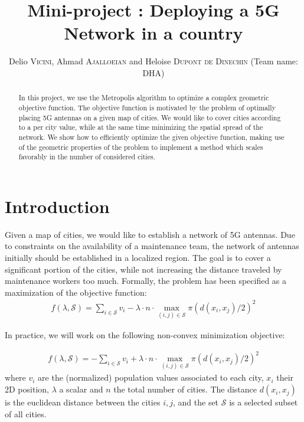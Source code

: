 \documentclass[conference,compsoc]{IEEEtran}
\newcommand{\selected}{\mathcal{S}}
\begin{document}
\title{\Large Mini-project : Deploying a 5G Network in a country }

\vspace{- 50 px}

\author{Delio \textsc{Vicini}, Ahmad \textsc{Ajalloeian} and Heloise
\textsc{Dupont de Dinechin} (Team name: DHA)\\
}

\maketitle
\begin{abstract}
  In this project, we use the Metropolis algorithm to optimize a complex
  geometric objective function. The objective function is motivated by the
  problem of optimally placing 5G antennas on a given map of cities. We would
  like to cover cities according to a per city value, while at the same time
  minimizing the spatial spread of the network. We show how to efficiently
  optimize the given objective function, making use of the geometric properties
  of the problem to implement a method which scales favorably in the number of
  considered cities.
\end{abstract}

\section{Introduction}
Given a map of cities, we would like to establish a network of 5G antennas. Due
to constraints on the availability of a maintenance team, the network of
antennas initially should be established in a localized region. The goal is to
cover a significant portion of the cities, while not increasing the distance
traveled by maintenance workers too much. Formally, the problem has been
specified as a maximization of the objective function:
\begin{align}
    f(\lambda, \selected) = \sum_{i \in \selected} v_i - \lambda \cdot n \cdot \max_{(i, j) \in \selected} \pi (d(x_i, x_j) /2) ^2
    \label{eq:objective}
\end{align}

In practice, we will work on the following non-convex minimization objective:

\begin{align}
    f(\lambda, \selected) = -\sum_{i \in \selected} v_i + \lambda \cdot n \cdot \max_{(i, j) \in \selected} \pi (d(x_i, x_j) /2) ^2
    \label{eq:objective}
\end{align}
where $v_i$ are the (normalized) population values associated to each city,
$x_i$ their 2D position, $\lambda$ a scalar and $n$ the total number of cities.
The distance $d(x_i, x_j)$ is the euclidean distance between the cities $i, j$,
and the set $\selected$ is a selected subset of all cities.
\end{document}
